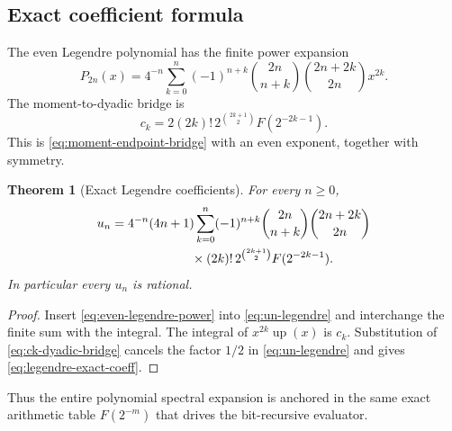 \documentclass[11pt,oneside]{article}
\newtheorem{theorem}{Theorem}[section]
\theoremstyle{definition}
\theoremstyle{remark}
\newcommand{\Up}{\operatorname{up}}
\begin{document}
\subsection{Exact coefficient formula}

The even Legendre polynomial has the finite power expansion
\begin{equation}
 P_{2n}(x)=4^{-n}\sum_{k=0}^{n}(-1)^{n+k}
 \binom{2n}{n+k}\binom{2n+2k}{2n}x^{2k}.                  \label{eq:even-legendre-power}
\end{equation}
The moment-to-dyadic bridge is
\begin{equation}
 c_k=2(2k)!\,2^{\binom{2k+1}{2}}F(2^{-2k-1}).              \label{eq:ck-dyadic-bridge}
\end{equation}
This is \eqref{eq:moment-endpoint-bridge} with an even exponent, together with symmetry.

\begin{theorem}[Exact Legendre coefficients]
For every $n\ge0$,
\begin{align}
 u_n
={}&4^{-n}(4n+1)\sum_{k=0}^{n}(-1)^{n+k}
 \binom{2n}{n+k}\binom{2n+2k}{2n}                         \notag\\
 &\hspace{5em}\times(2k)!\,2^{\binom{2k+1}{2}}
 F(2^{-2k-1}).                                             \label{eq:legendre-exact-coeff}
\end{align}
In particular every $u_n$ is rational.
\end{theorem}

\begin{proof}
Insert \eqref{eq:even-legendre-power} into \eqref{eq:un-legendre} and interchange the finite
sum with the integral.  The integral of $x^{2k}\Up(x)$ is $c_k$.  Substitution of
\eqref{eq:ck-dyadic-bridge} cancels the factor $1/2$ in
\eqref{eq:un-legendre} and gives \eqref{eq:legendre-exact-coeff}.
\end{proof}

Thus the entire polynomial spectral expansion is anchored in the same exact arithmetic table
$F(2^{-m})$ that drives the bit-recursive evaluator.
\end{document}
